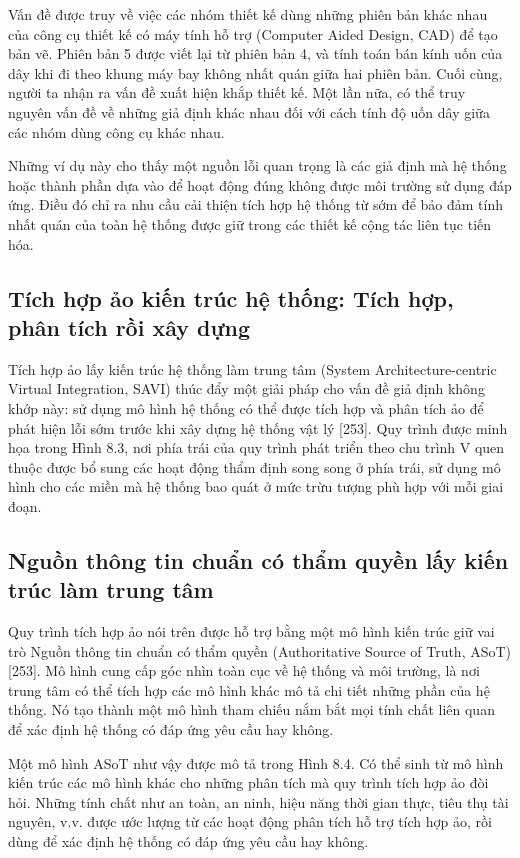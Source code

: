 Vấn đề được truy về việc các nhóm thiết kế dùng những phiên bản khác nhau của công cụ thiết kế có máy tính hỗ trợ (Computer Aided Design, CAD) để tạo bản vẽ. Phiên bản 5 được viết lại từ phiên bản 4, và tính toán bán kính uốn của dây khi đi theo khung máy bay không nhất quán giữa hai phiên bản. Cuối cùng, người ta nhận ra vấn đề xuất hiện khắp thiết kế. Một lần nữa, có thể truy nguyên vấn đề về những giả định khác nhau đối với cách tính độ uốn dây giữa các nhóm dùng công cụ khác nhau.

Những ví dụ này cho thấy một nguồn lỗi quan trọng là các giả định mà hệ thống hoặc thành phần dựa vào để hoạt động đúng không được môi trường sử dụng đáp ứng. Điều đó chỉ ra nhu cầu cải thiện tích hợp hệ thống từ sớm để bảo đảm tính nhất quán của toàn hệ thống được giữ trong các thiết kế cộng tác liên tục tiến hóa.

\subsection{Tích hợp ảo kiến trúc hệ thống: Tích hợp, phân tích rồi xây dựng}
Tích hợp ảo lấy kiến trúc hệ thống làm trung tâm (System Architecture-centric Virtual Integration, SAVI) thúc đẩy một giải pháp cho vấn đề giả định không khớp này: sử dụng mô hình hệ thống có thể được tích hợp và phân tích ảo để phát hiện lỗi sớm trước khi xây dựng hệ thống vật lý [253]. Quy trình được minh họa trong Hình 8.3, nơi phía trái của quy trình phát triển theo chu trình V quen thuộc được bổ sung các hoạt động thẩm định song song ở phía trái, sử dụng mô hình cho các miền mà hệ thống bao quát ở mức trừu tượng phù hợp với mỗi giai đoạn.

\subsection{Nguồn thông tin chuẩn có thẩm quyền lấy kiến trúc làm trung tâm}
Quy trình tích hợp ảo nói trên được hỗ trợ bằng một mô hình kiến trúc giữ vai trò Nguồn thông tin chuẩn có thẩm quyền (Authoritative Source of Truth, ASoT) [253]. Mô hình cung cấp góc nhìn toàn cục về hệ thống và môi trường, là nơi trung tâm có thể tích hợp các mô hình khác mô tả chi tiết những phần của hệ thống. Nó tạo thành một mô hình tham chiếu nắm bắt mọi tính chất liên quan để xác định hệ thống có đáp ứng yêu cầu hay không.

Một mô hình ASoT như vậy được mô tả trong Hình 8.4. Có thể sinh từ mô hình kiến trúc các mô hình khác cho những phân tích mà quy trình tích hợp ảo đòi hỏi. Những tính chất như an toàn, an ninh, hiệu năng thời gian thực, tiêu thụ tài nguyên, v.v. được ước lượng từ các hoạt động phân tích hỗ trợ tích hợp ảo, rồi dùng để xác định hệ thống có đáp ứng yêu cầu hay không.

